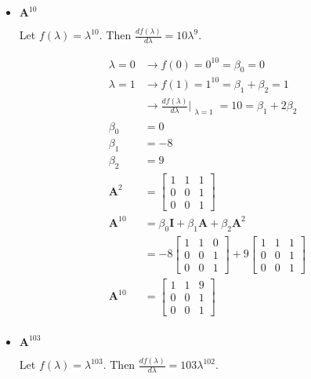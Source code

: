 \begin{itemize}
 \item $\mathbf{A}^{10}$

 Let $f(\lambda) = \lambda^{10}$.
 Then $\frac{d f(\lambda)}{d\lambda} = 10 \lambda^9$.

 \begin{align*}
  \lambda = 0 & \rightarrow f(0) = 0^{10} = \beta_0 = 0\\
  \lambda = 1 & \rightarrow f(1) = 1^{10} = \beta_1 + \beta_2 = 1\\
  &\rightarrow \frac{d f(\lambda)}{d\lambda}\Bigr|_{\substack{\lambda=1}} = 10 = \beta_1 + 2 \beta_2\\
  \beta_0 &= 0\\
  \beta_1 &= -8\\
  \beta_2 &= 9\\
  \mathbf{A}^2 &= \begin{bmatrix}
                   1 & 1&1\\
                   0 &0&1\\
                   0 &0 &1
                  \end{bmatrix}\\
    \mathbf{A}^{10} &= \beta_0 \mathbf{I} +  \beta_1 \mathbf{A} + \beta_2 \mathbf{A}^2\\
    &= -8 \begin{bmatrix}
           1& 1& 0\\
           0 & 0 & 1\\
           0 & 0 &1
          \end{bmatrix}
+
9       \begin{bmatrix}
            1 & 1&1\\
            0 &0&1\\
            0 &0 &1
        \end{bmatrix}\\
         \mathbf{A}^{10} &=  \begin{bmatrix}
            1 & 1&9\\
            0 &0&1\\
            0 &0 &1
        \end{bmatrix}\\
 \end{align*}


 \item $\mathbf{A}^{103}$

  Let $f(\lambda) = \lambda^{103}$.
 Then $\frac{d f(\lambda)}{d\lambda} = 103 \lambda^{102}$.


\end{itemize}
